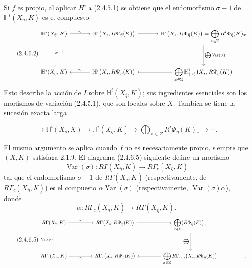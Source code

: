 Si $f$ es propio, al aplicar $H^i$ a (2.4.6.1) se obtiene que el endomorfismo
$\sigma-1$ de $\mathbb H^i(X_{\bar\eta},K)$ es el compuesto
\begin{equation}\tag{2.4.6.2}
\resizebox{\textwidth}{!}{%
\begin{tikzcd}[ampersand replacement=\&, column sep=large, row sep=huge]
\mathbb H^i(X_{\bar\eta},K)
  \arrow[r, "\sim"] \arrow[d, "\sigma-1"]
  \& \mathbb H^i\bigl(X_s,R\Psi_{\bar\eta}(K)\bigr)
     \arrow[r]
  \& \mathbb H^i\bigl(X_s,R\Phi_{\bar\eta}(K)\bigr)
     =\displaystyle\bigoplus_{x\in\Sigma}R^i\Phi_{\bar\eta}(K)_x
     \arrow[d, "{\bigoplus\operatorname{Var}(\sigma)}"] \\
\mathbb H^i(X_{\bar\eta},K)
  \& \mathbb H^i\bigl(X_s,R\Psi_{\bar\eta}(K)\bigr)
     \arrow[l, "\sim"']
  \& \displaystyle\bigoplus_{x\in\Sigma}
     \mathbb H^i_{\{x\}}\bigl(X_s,R\Psi_{\bar\eta}(K)\bigr)
     \arrow[l]
\end{tikzcd}}
\end{equation}
Esto describe la acción de $I$ sobre $\mathbb H^i(X_{\bar\eta},K)$; sus
ingredientes esenciales son los morfismos de variación (2.4.5.1), que son
locales sobre $X$. También se tiene la sucesión exacta larga

\pageoriginale

\begin{equation}\tag{2.4.6.3}
\longrightarrow \mathbb H^i(X_s,K)
\longrightarrow \mathbb H^i(X_{\bar\eta},K)
\longrightarrow \bigoplus_{x\in\Sigma}R^i\Phi_{\bar\eta}(K)_x
\longrightarrow\cdots .
\end{equation}

El mismo argumento se aplica cuando $f$ no es necesariamente propio, siempre
que $(X,K)$ satisfaga 2.1.9. El diagrama (2.4.6.5) siguiente define un
morfismo
\begin{equation}\tag{2.4.6.4}
\operatorname{Var}(\sigma):
R\Gamma(X_{\bar\eta},K)\longrightarrow R\Gamma_c(X_{\bar\eta},K)
\end{equation}
tal que el endomorfismo $\sigma-1$ de $R\Gamma(X_{\bar\eta},K)$
(respectivamente, de $R\Gamma_c(X_{\bar\eta},K)$) es el compuesto
$\alpha\operatorname{Var}(\sigma)$ (respectivamente,
$\operatorname{Var}(\sigma)\alpha$), donde
\[
\alpha:R\Gamma_c(X_{\bar\eta},K)\longrightarrow
R\Gamma(X_{\bar\eta},K).
\]
\begin{equation}\tag{2.4.6.5}
\resizebox{\textwidth}{!}{%
\begin{tikzcd}[ampersand replacement=\&, column sep=huge, row sep=huge]
R\Gamma(X_{\bar\eta},K)
  \arrow[r, "\sim"] \arrow[d, "\operatorname{Var}(\sigma)"']
  \& R\Gamma\bigl(X_s,R\Psi_{\bar\eta}(K)\bigr)
     \arrow[r]
  \& \displaystyle\bigoplus_{x\in\Sigma}
     \bigl(R\Phi_{\bar\eta}(K)\bigr)_x
     \arrow[d, "\bigoplus"']
  \& {} \\
R\Gamma_c(X_{\bar\eta},K)
  \arrow[r, "\sim"']
  \& R\Gamma_c\bigl(X_s,R\Psi_{\bar\eta}(K)\bigr)
  \& \displaystyle\bigoplus_{x\in\Sigma}
     R\Gamma_{\{x\}}\bigl(X_s,R\Psi_{\bar\eta}(K)\bigr)
     \arrow[l]
  \& .
\end{tikzcd}}
\end{equation}

